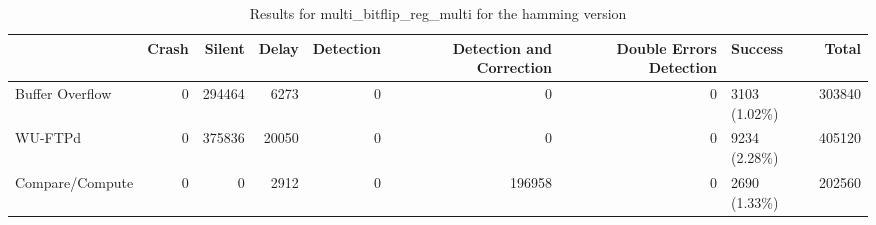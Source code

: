 \begin{table}[t]
	\centering
	\caption{Results for multi_bitflip_reg_multi for the hamming version}
	\label{table:end_sim_by_status_hamming_1_multi_bitflip_reg_multi}
	\begin{tabular}{lrrrrrrlr}
		\toprule
		                & Crash & Silent & Delay & Detection & Detection and Correction & Double Errors Detection & Success       & Total  \\
		\midrule
		Buffer Overflow & 0     & 294464 & 6273  & 0         & 0                        & 0                       & 3103 (1.02\%) & 303840 \\
		WU-FTPd         & 0     & 375836 & 20050 & 0         & 0                        & 0                       & 9234 (2.28\%) & 405120 \\
		Compare/Compute & 0     & 0      & 2912  & 0         & 196958                   & 0                       & 2690 (1.33\%) & 202560 \\
		\bottomrule
	\end{tabular}
\end{table}
